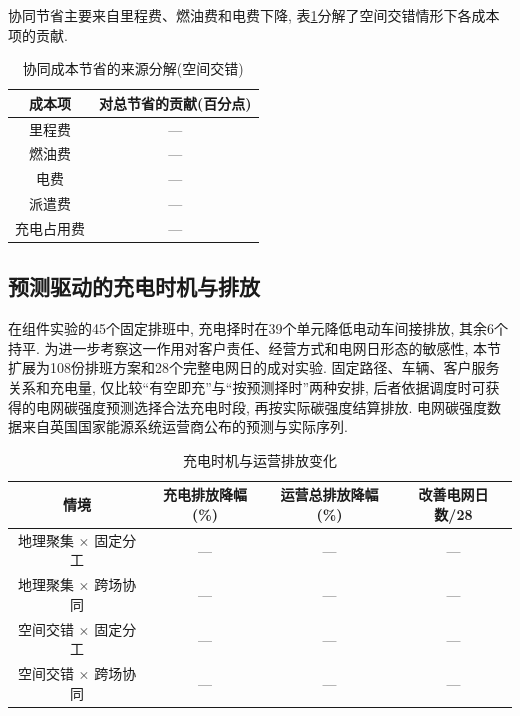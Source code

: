 \documentclass{setp-new}
\newcommand{\setptabsetup}{\fontsize{9pt}{10.5pt}\selectfont\renewcommand{\arraystretch}{0.90}\setlength{\tabcolsep}{2.2pt}\setlength{\aboverulesep}{0.4pt}\setlength{\belowrulesep}{0.4pt}\hbadness=10000}
\begin{document}
协同节省主要来自里程费、燃油费和电费下降,
表\ref{tab:collaborative-sources}分解了空间交错情形下各成本项的贡献.

\begin{table}[H]
\centering
\caption{协同成本节省的来源分解(空间交错)}
\label{tab:collaborative-sources}
\setptabsetup
\begin{tabular}{@{}cc@{}}
\toprule
成本项 & 对总节省的贡献(百分点)\\
\midrule
里程费  & ---\\
燃油费  & ---\\
电费    & ---\\
派遣费  & ---\\
充电占用费 & ---\\
\bottomrule
\end{tabular}
\end{table}

\subsection{预测驱动的充电时机与排放}

在组件实验的45个固定排班中, 充电择时在39个单元降低电动车间接排放,
其余6个持平.
为进一步考察这一作用对客户责任、经营方式和电网日形态的敏感性,
本节扩展为108份排班方案和28个完整电网日的成对实验.
固定路径、车辆、客户服务关系和充电量,
仅比较``有空即充''与``按预测择时''两种安排,
后者依据调度时可获得的电网碳强度预测选择合法充电时段, 再按实际碳强度结算排放.
电网碳强度数据来自英国国家能源系统运营商公布的预测与实际序列\cite{ref:29,ref:30}.

\begin{table}[H]
\centering
\caption{充电时机与运营排放变化}
\label{tab:charging-emissions}
\setptabsetup
\begin{tabular}{@{}cccc@{}}
\toprule
情境 & 充电排放降幅(\%) & 运营总排放降幅(\%) & 改善电网日数/28\\
\midrule
地理聚集$\,\times\,$固定分工 & --- & --- & ---\\
地理聚集$\,\times\,$跨场协同 & --- & --- & ---\\
空间交错$\,\times\,$固定分工 & --- & --- & ---\\
空间交错$\,\times\,$跨场协同 & --- & --- & ---\\
\bottomrule
\end{tabular}
\end{table}
\end{document}
